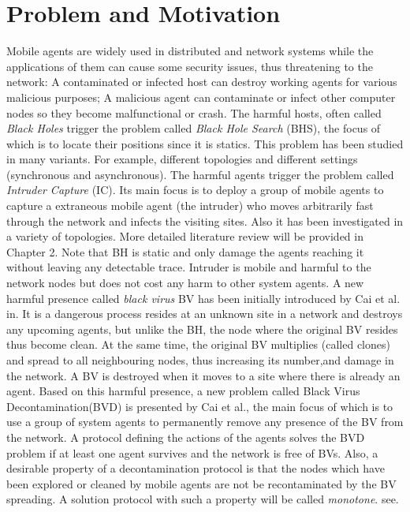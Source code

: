 \section{Problem and Motivation} 
Mobile agents are widely used in distributed and network systems while the applications of them can cause some security issues, thus threatening to the network: A contaminated or infected host can destroy working agents for various malicious purposes; A malicious agent can contaminate or infect other computer nodes so they become malfunctional or crash.
  The harmful hosts, often called {\em Black Holes} trigger the problem called {\em Black Hole Search} (BHS), the focus of which is to locate their positions since it is statics. This problem has been studied in many variants. For example, different topologies and different settings (synchronous and asynchronous). The harmful agents trigger the problem called {\em Intruder Capture} (IC). Its main focus is to deploy a group of mobile agents to capture a extraneous mobile agent (the intruder) who moves arbitrarily fast through the network and infects the visiting sites. Also it has been investigated in a variety of topologies. More detailed literature review will be provided in Chapter 2. Note that BH is static and only damage the agents reaching it without leaving any detectable trace. Intruder is mobile and harmful to the network nodes but does not cost any harm to other system agents. 
    A new harmful presence called {\em black virus} BV has been initially introduced by Cai et al. in\cite{Cai}. It is a dangerous process resides at an unknown site in a network and destroys any upcoming agents, but unlike the BH, the node where the original BV resides thus become clean. At the same time, the original BV multiplies (called clones) and spread to all neighbouring nodes, thus increasing its number,and damage in the network. A BV is destroyed when it moves to a site where there is already an agent. Based on this harmful presence, a new problem called Black Virus Decontamination(BVD) is presented by Cai et al., the main focus of which is to use a group of system agents to permanently remove any presence of the BV from the network. A protocol defining the actions of the agents solves the BVD problem if at least one agent survives and the network is free of BVs. Also, a desirable property of a  decontamination protocol is that the nodes which have been explored or cleaned by mobile agents are not be recontaminated by the BV spreading. A solution protocol with such a property will be called {\em monotone}. see\cite{monotone}.
